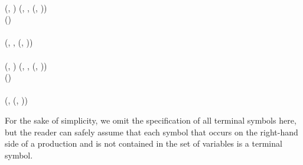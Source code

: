 \begin{table}
\begin{bnf*}
		 \\
		 {
			(, \bnfsp {}) \bnfor {}(, \bnfsp {}, \bnfsp {}(, \bnfsp {}))
		} \\
		 {
			() \bnfsp {} \bnfsp {}
		} \\ \\
		 {
			(\bnfts{$\omega$}, \bnfsp {}, \bnfsp {}(, \bnfsp {})) \bnfor
		} \\
		 \\
		 {
			(, \bnfsp {}) \bnfor {}(, \bnfsp {}, \bnfsp {}(, \bnfsp {}))
		} \\ 
		 {
			() \bnfsp {} \bnfsp {}
		} \\ \\
		 {
			(, \bnfsp {}(, \bnfsp {}))
		} \\
		 {
			 \bnfor \bnfes
		}
	\end{bnf*}
\end{table}
For the sake of simplicity, we omit the specification of all terminal symbols here, but the reader can safely assume that each symbol that occurs on the right-hand side of a production and is not contained in the set of variables is a terminal symbol.

